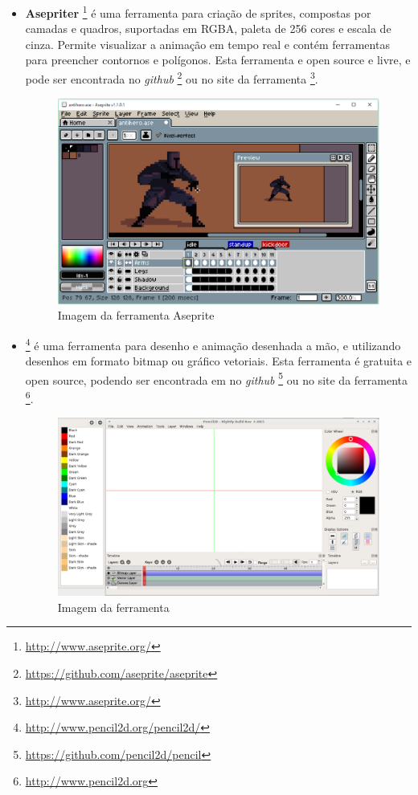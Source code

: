 \begin{itemize}
    \item \textbf{Asepriter}
\footnote{\url{http://www.aseprite.org/}} é uma ferramenta para criação de sprites,
 compostas por camadas e quadros, suportadas em RGBA, paleta de 256 cores e escala de cinza.
 Permite visualizar a animação em tempo real e contém ferramentas para preencher contornos
 e polígonos. Esta ferramenta e open source e livre, e pode ser encontrada no \textit{github}
\footnote{\url{https://github.com/aseprite/aseprite}} ou no site da ferramenta
\footnote{\url{http://www.aseprite.org/}}.

    \begin{figure}[h]
        \centering
            \includegraphics[scale=0.3]{figuras/aseprite.eps}
        \caption{Imagem da ferramenta Aseprite}
        \label{ferramenta_aseprite}
    \end{figure}

    \item \textbf{}
\footnote{\url{http://www.pencil2d.org/pencil2d/}} é uma ferramenta para
 desenho e animação desenhada a mão, e utilizando desenhos em formato bitmap ou gráfico vetoriais. 
Esta ferramenta é gratuita  e open source, podendo ser encontrada em no \textit{github}
\footnote{\url{https://github.com/pencil2d/pencil}} ou no site da ferramenta
\footnote{\url{http://www.pencil2d.org}}.

    \begin{figure}[h]
        \centering
            \includegraphics[scale=0.3]{figuras/pencil2D.eps}
        \caption{Imagem da ferramenta }
        \label{ferramenta_pencil2D}
    \end{figure}


\end{itemize}
